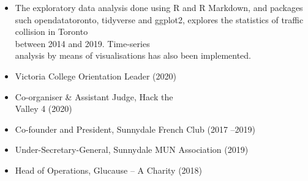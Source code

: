 \smallskip


\begin{itemize}
    \item The exploratory data analysis done using R and R Markdown, and packages such opendatatoronto, tidyverse and ggplot2, explores the statistics of traffic collision in Toronto \\between 2014 and 2019. Time-series \\analysis by means of visualisations has also been implemented.
\end{itemize}


\begin{itemize}
    \item Victoria  College  Orientation  Leader  (2020)
    \item Co-organiser  \&  Assistant  Judge,  Hack  the \\ Valley  4  (2020)
    \item Co-founder  and  President, Sunnydale French Club (2017 –2019)
    \item Under-Secretary-General, Sunnydale MUN Association (2019)
    \item Head of Operations, Glucause – A Charity (2018)
    
\end{itemize}

\cvproject{}